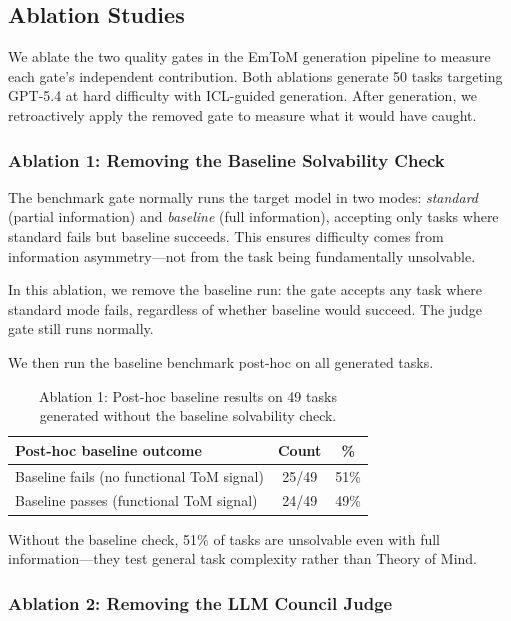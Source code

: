 
\subsection{Ablation Studies}
\label{sec:ablations}

We ablate the two quality gates in the EmToM generation pipeline to measure each gate's independent contribution.
Both ablations generate 50 tasks targeting GPT-5.4 at hard difficulty with ICL-guided generation.
After generation, we retroactively apply the removed gate to measure what it would have caught.

\subsubsection{Ablation 1: Removing the Baseline Solvability Check}
\label{sec:ablation_baseline}

The benchmark gate normally runs the target model in two modes: \emph{standard} (partial information) and \emph{baseline} (full information), accepting only tasks where standard fails but baseline succeeds.
This ensures difficulty comes from information asymmetry---not from the task being fundamentally unsolvable.

In this ablation, we remove the baseline run: the gate accepts any task where standard mode fails, regardless of whether baseline would succeed.
The judge gate still runs normally.

We then run the baseline benchmark post-hoc on all generated tasks.

\begin{table}[h]
\centering
\caption{Ablation 1: Post-hoc baseline results on 49 tasks generated without the baseline solvability check.}
\label{tab:ablation_baseline}
\begin{tabular}{@{}lcc@{}}
\toprule
\textbf{Post-hoc baseline outcome} & \textbf{Count} & \textbf{\%} \\
\midrule
Baseline fails (no functional ToM signal) & 25/49 & 51\% \\
Baseline passes (functional ToM signal) & 24/49 & 49\% \\
\bottomrule
\end{tabular}
\end{table}

Without the baseline check, 51\% of tasks are unsolvable even with full information---they test general task complexity rather than Theory of Mind.

\subsubsection{Ablation 2: Removing the LLM Council Judge}
\label{sec:ablation_judge}

